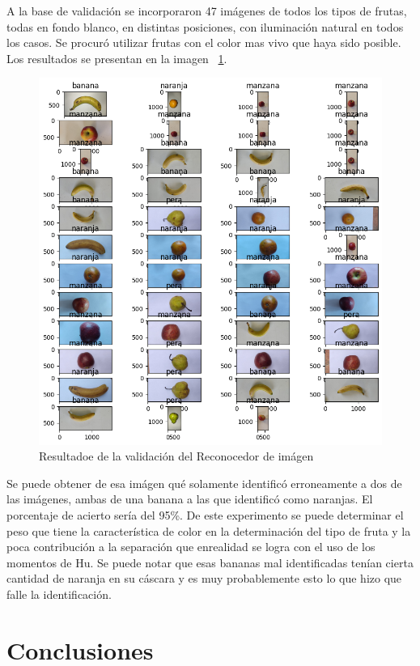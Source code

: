 \documentclass[a4paper, 12pt]{article}
\begin{document}
A la base de validación se incorporaron 47 imágenes de todos los tipos de frutas, todas en fondo blanco, en distintas posiciones, con iluminación natural en todos los casos. Se procuró utilizar frutas con el color mas vivo que haya sido posible.
Los resultados se presentan en la imagen ~\ref{RESULTADOS VALIDACION IMAGEN}.
\begin{figure}[!htbp]
    \centering
    \includegraphics[width=\linewidth]{VALIDACION_IMAGEN_RESULTADOS.png}
    \caption{Resultadoe de la validación del Reconocedor de imágen}
    \label{RESULTADOS VALIDACION IMAGEN}
\end{figure}
Se puede obtener de esa imágen qué solamente identificó erroneamente a dos de las imágenes, ambas de una banana a las que identificó como naranjas. El porcentaje de acierto sería del 95\%. De este experimento se puede determinar el peso que tiene la característica de color en la determinación del tipo de fruta y la poca contribución a la separación que enrealidad se logra con el uso de los momentos de Hu. Se puede notar que esas bananas mal identificadas tenían cierta cantidad de naranja en su cáscara y es muy probablemente esto lo que hizo que falle la identificación.

\section{Conclusiones}
\end{document}
